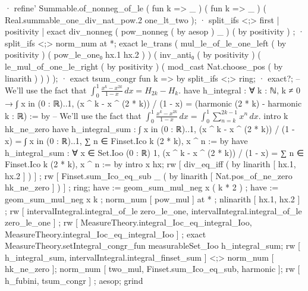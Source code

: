       · refine' Summable.of_nonneg_of_le ( fun k => _ ) ( fun k => _ ) ( Real.summable_one_div_nat_pow.2 one_lt_two );
        · split_ifs <;> first | positivity | exact div_nonneg ( pow_nonneg ( by aesop ) _ ) ( by positivity ) ;
        · split_ifs <;> norm_num at *;
          exact le_trans ( mul_le_of_le_one_left ( by positivity ) ( pow_le_one₀ hx.1 hx.2 ) ) ( inv_anti₀ ( by positivity ) ( le_mul_of_one_le_right ( by positivity ) ( mod_cast Nat.choose_pos ( by linarith ) ) ) );
    · exact tsum_congr fun k => by split_ifs <;> ring;
    · exact?;
  -- We'll use the fact that $\int_0^1 \frac{x^k - x^{2k}}{1-x} \, dx = H_{2k} - H_k$.
  have h_integral : ∀ k : ℕ, k ≠ 0 → ∫ x in (0 : ℝ)..1, (x ^ k - x ^ (2 * k)) / (1 - x) = (harmonic (2 * k) - harmonic k : ℝ) := by
    -- We'll use the fact that $\int_0^1 \frac{x^k - x^{2k}}{1-x} \, dx = \int_0^1 \sum_{n=k}^{2k-1} x^n \, dx$.
    intro k hk_ne_zero
    have h_integral_sum : ∫ x in (0 : ℝ)..1, (x ^ k - x ^ (2 * k)) / (1 - x) = ∫ x in (0 : ℝ)..1, ∑ n ∈ Finset.Ico k (2 * k), x ^ n := by
      have h_integral_sum : ∀ x ∈ Set.Ioo (0 : ℝ) 1, (x ^ k - x ^ (2 * k)) / (1 - x) = ∑ n ∈ Finset.Ico k (2 * k), x ^ n := by
        intro x hx; rw [ div_eq_iff ( by linarith [ hx.1, hx.2 ] ) ] ; rw [ Finset.sum_Ico_eq_sub _ ( by linarith [ Nat.pos_of_ne_zero hk_ne_zero ] ) ] ; ring;
        have := geom_sum_mul_neg x ( k * 2 ) ; have := geom_sum_mul_neg x k ; norm_num [ pow_mul ] at * ; nlinarith [ hx.1, hx.2 ] ;
      rw [ intervalIntegral.integral_of_le zero_le_one, intervalIntegral.integral_of_le zero_le_one ] ; rw [ MeasureTheory.integral_Ioc_eq_integral_Ioo, MeasureTheory.integral_Ioc_eq_integral_Ioo ] ; exact MeasureTheory.setIntegral_congr_fun measurableSet_Ioo h_integral_sum;
    rw [ h_integral_sum, intervalIntegral.integral_finset_sum ] <;> norm_num [ hk_ne_zero ];
    norm_num [ two_mul, Finset.sum_Ico_eq_sub, harmonic ];
  rw [ h_fubini, tsum_congr ] ; aesop;
  grind


